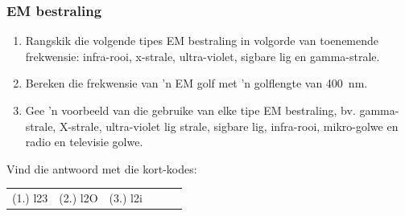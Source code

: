                \subsubsection*{EM bestraling}
            \nopagebreak
      \label{m38778*id188768}\begin{enumerate}[noitemsep, label=\textbf{\arabic*}. ] 
            \label{m38778*uid10}\item Rangskik die volgende tipes EM bestraling in volgorde van toenemende frekwensie: infra-rooi, x-strale, ultra-violet, sigbare lig en gamma-strale.\newline
\label{m38778*uid11}\item Bereken die frekwensie van 'n EM golf met 'n golflengte van 400~nm.\newline
\label{m38778*uid12}\item Gee 'n voorbeeld van die gebruike van elke tipe EM bestraling, bv. gamma-strale, X-strale, ultra-violet lig strale, sigbare lig, infra-rooi, mikro-golwe en radio en televisie golwe.\newline
\end{enumerate}
    \label{m38778*cid6}
\par {} Vind die antwoord met die kort-kodes:
 \par \begin{tabular}[h]{cccccc}
 (1.) l23  &  (2.) l2O  &  (3.) l2i  & \end{tabular}

